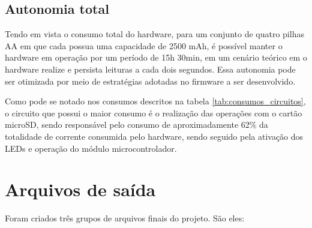 	\begin{table}[!h]
	\captionsetup{width=7cm}%
    \end{table}

\newpage
\subsection{Autonomia total}

Tendo em vista o consumo total do hardware, para um conjunto de quatro pilhas AA em que cada possua uma capacidade de 2500 mAh, é possível manter o hardware em operação por um período de 15h 30min, em um cenário teórico em o hardware realize e persista leituras a cada dois segundos. Essa autonomia pode ser otimizada por meio de estratégias adotadas no firmware a ser desenvolvido. 

Como pode se notado nos consumos descritos na tabela \ref{tab:consumos_circuitos}, o circuito que possui o maior consumo é o realização das operações com o cartão microSD, sendo responsável pelo consumo de aproximadamente 62\% da totalidade de corrente consumida pelo hardware, sendo seguido pela ativação dos LEDs e operação do módulo microcontrolador. 


\section{Arquivos de saída}

Foram criados três grupos de arquivos finais do projeto. São eles: 

